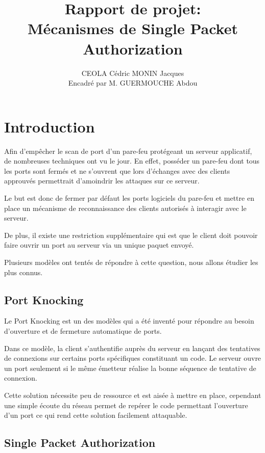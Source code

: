 \documentclass[12pt]{article}
\title{Rapport de projet:\\
Mécanismes de Single Packet Authorization}
\author{CEOLA Cédric MONIN Jacques\\
Encadré par M. GUERMOUCHE Abdou}
\begin{document}
\maketitle

\clearpage                  
\tableofcontents
\clearpage

\section{Introduction}

Afin d'empêcher le scan de port d'un pare-feu protégeant un serveur applicatif, de nombreuses techniques ont vu le jour. En effet, posséder un pare-feu dont tous les ports sont fermés et ne s'ouvrent que lors d'échanges avec des clients approuvés permettrait d'amoindrir les attaques sur ce serveur.

Le but est donc de fermer par défaut les ports logiciels du pare-feu et mettre en place un mécanisme de reconnaissance des clients autorisés à interagir avec le serveur.

De plus, il existe une restriction supplémentaire qui est que le client doit pouvoir faire ouvrir un port au serveur via un unique paquet envoyé.

Plusieurs modèles ont tentés de répondre à cette question, nous allons étudier les plus connus.

\subsection{Port Knocking}

Le Port Knocking est un des modèles qui a été inventé pour répondre au besoin d'ouverture et de fermeture automatique de ports.

Dans ce modèle, la client s'authentifie auprès du serveur en lançant des tentatives de connexions sur certains ports spécifiques constituant un code. Le serveur ouvre un port seulement si le même émetteur réalise la bonne séquence de tentative de connexion.

Cette solution nécessite peu de ressource et est aisée à mettre en place, cependant une simple écoute du réseau permet de repérer le code permettant l'ouverture d'un port ce qui rend cette solution facilement attaquable.

\subsection{Single Packet Authorization}
\end{document}
